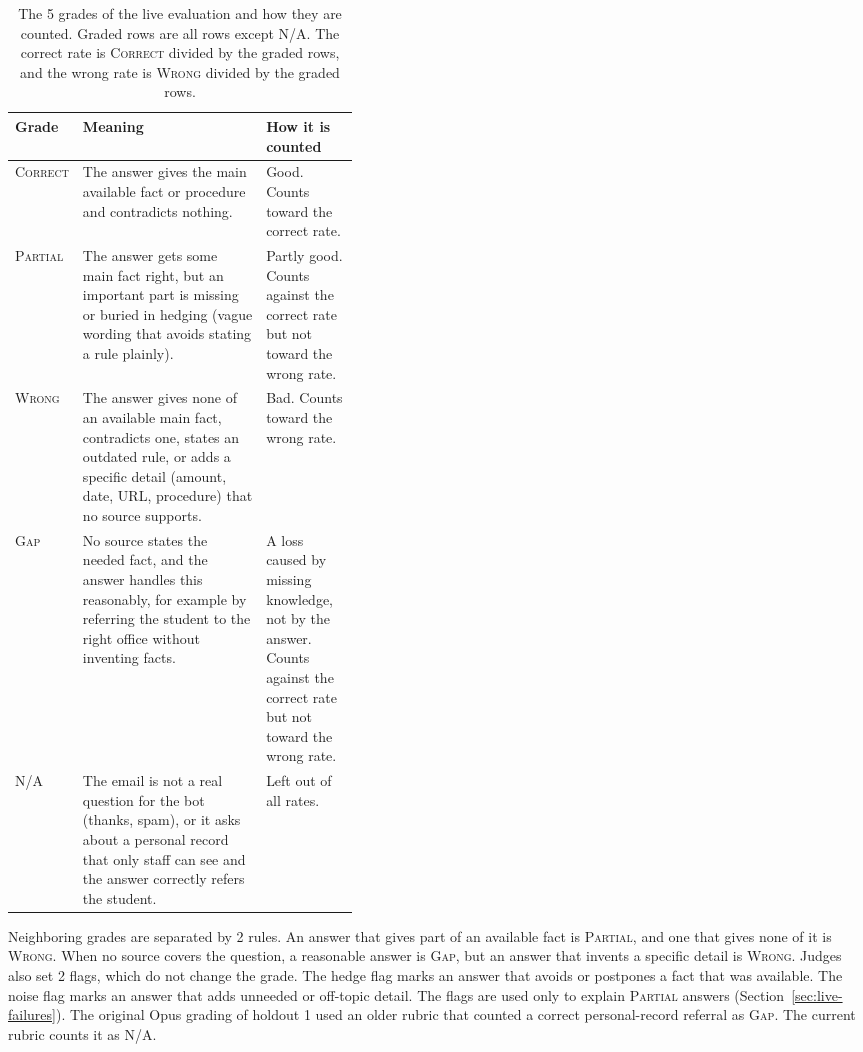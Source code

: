 \begin{table}[htbp]
\centering
\caption[The 5 grades of the live evaluation and how they are counted]{The 5 grades of the live evaluation and how they are counted. Graded rows are all rows except \textsc{N/A}. The correct rate is \textsc{Correct} divided by the graded rows, and the wrong rate is \textsc{Wrong} divided by the graded rows.}
\label{tab:live-grades}
\small
\begin{tabularx}{\linewidth}{@{}>{\raggedright\arraybackslash}p{0.13\linewidth}>{\raggedright\arraybackslash}X>{\raggedright\arraybackslash}p{0.27\linewidth}@{}}
\toprule
Grade & Meaning & How it is counted \\
\midrule
\textsc{Correct} & The answer gives the main available fact or procedure and contradicts nothing. & Good. Counts toward the correct rate. \\
\textsc{Partial} & The answer gets some main fact right, but an important part is missing or buried in hedging (vague wording that avoids stating a rule plainly). & Partly good. Counts against the correct rate but not toward the wrong rate. \\
\textsc{Wrong} & The answer gives none of an available main fact, contradicts one, states an outdated rule, or adds a specific detail (amount, date, URL, procedure) that no source supports. & Bad. Counts toward the wrong rate. \\
\textsc{Gap} & No source states the needed fact, and the answer handles this reasonably, for example by referring the student to the right office without inventing facts. & A loss caused by missing knowledge, not by the answer. Counts against the correct rate but not toward the wrong rate. \\
\textsc{N/A} & The email is not a real question for the bot (thanks, spam), or it asks about a personal record that only staff can see and the answer correctly refers the student. & Left out of all rates. \\
\bottomrule
\end{tabularx}
\end{table}

Neighboring grades are separated by 2 rules. An answer that gives part of an available fact is \textsc{Partial}, and one that gives none of it is \textsc{Wrong}. When no source covers the question, a reasonable answer is \textsc{Gap}, but an answer that invents a specific detail is \textsc{Wrong}. Judges also set 2 flags, which do not change the grade. The hedge flag marks an answer that avoids or postpones a fact that was available. The noise flag marks an answer that adds unneeded or off-topic detail. The flags are used only to explain \textsc{Partial} answers (Section~\ref{sec:live-failures}). The original Opus grading of holdout 1 used an older rubric that counted a correct personal-record referral as \textsc{Gap}. The current rubric counts it as \textsc{N/A}.


